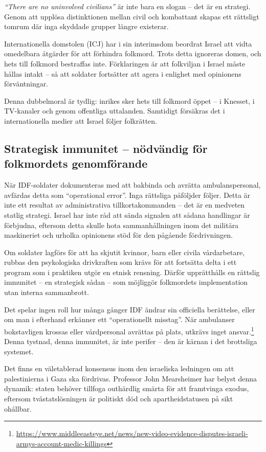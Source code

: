 \textit{“There are no uninvolved civilians”} är inte bara en slogan – det är en strategi. Genom att upplösa distinktionen mellan civil och kombattant skapas ett rättsligt tomrum där inga skyddade grupper längre existerar.

Internationella domstolen (ICJ) har i sin interimsdom beordrat Israel att vidta omedelbara åtgärder för att förhindra folkmord. Trots detta ignoreras domen, och hets till folkmord bestraffas inte. Förklaringen är att folkviljan i Israel måste hållas intakt – så att soldater fortsätter att agera i enlighet med opinionens förväntningar.

Denna dubbelmoral är tydlig: inrikes sker hets till folkmord öppet – i Knesset, i TV-kanaler och genom offentliga uttalanden. Samtidigt försäkras det i internationella medier att Israel följer folkrätten.


\subsection{Strategisk immunitet – nödvändig för folkmordets genomförande}

När IDF-soldater dokumenteras med att bakbinda och avrätta ambulanspersonal, avfärdas detta som \enquote{operational error}. Inga rättsliga påföljder följer. Detta är inte ett resultat av administrativa tillkortakommanden – det är en medveten statlig strategi. Israel har inte råd att sända signalen att sådana handlingar är förbjudna, eftersom detta skulle hota sammanhållningen inom det militära maskineriet och urholka opinionens stöd för den pågående fördrivningen.

Om soldater lagförs för att ha skjutit kvinnor, barn eller civila vårdarbetare, rubbas den psykologiska drivkraften som krävs för att fortsätta delta i ett program som i praktiken utgör en etnisk rensning. Därför upprätthålls en rättslig immunitet – en strategisk sådan – som möjliggör folkmordets implementation utan interna sammanbrott.

Det spelar ingen roll hur många gånger IDF ändrar sin officiella berättelse, eller om man i efterhand erkänner ett \enquote{operationellt misstag}. När ambulanser bokstavligen krossas eller vårdpersonal avrättas på plats, utkrävs inget ansvar.\footnote{\url{https://www.middleeasteye.net/news/new-video-evidence-disputes-israeli-armys-account-medic-killings}} Denna tystnad, denna immunitet, är inte perifer – den är kärnan i det brottsliga systemet.

Det finns en väletablerad konsensus inom den israeliska ledningen om att palestinierna i Gaza ska fördrivas. Professor John Mearsheimer har belyst denna dynamik: staten behöver tillfoga outhärdlig smärta för att framtvinga exodus, eftersom tvåstatslösningen är politiskt död och apartheidstatusen på sikt ohållbar.

